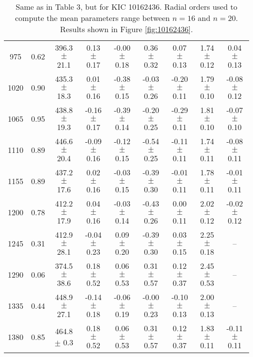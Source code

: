 \documentclass[twocolumn]{aastex61}%
\begin{document}
\begin{table*}[ht]
\begin{tabular}{ccc|ccccc|c}
975 & 0.62 & 396.3 $\pm$ 21.1 & 0.13 $\pm$ 0.17 & -0.00 $\pm$ 0.18 & 0.36 $\pm$ 0.32 & 0.07 $\pm$ 0.13 & 1.74 $\pm$ 0.12 & 0.04 $\pm$ 0.13\\
1020 & 0.90 & 435.3 $\pm$ 18.3 & 0.01 $\pm$ 0.16 & -0.38 $\pm$ 0.15 & -0.03 $\pm$ 0.26 & -0.20 $\pm$ 0.11 & 1.79 $\pm$ 0.10 & -0.08 $\pm$ 0.12\\
1065 & 0.95 & 438.8 $\pm$ 19.3 & -0.16 $\pm$ 0.17 & -0.39 $\pm$ 0.14 & -0.20 $\pm$ 0.25 & -0.29 $\pm$ 0.11 & 1.81 $\pm$ 0.10 & -0.07 $\pm$ 0.10\\
1110 & 0.89 & 446.6 $\pm$ 20.4 & -0.09 $\pm$ 0.16 & -0.12 $\pm$ 0.15 & -0.54 $\pm$ 0.25 & -0.11 $\pm$ 0.11 & 1.74 $\pm$ 0.11 & -0.08 $\pm$ 0.11\\
1155 & 0.89 & 437.2 $\pm$ 17.6 & 0.02 $\pm$ 0.16 & -0.03 $\pm$ 0.15 & -0.39 $\pm$ 0.30 & -0.01 $\pm$ 0.11 & 1.78 $\pm$ 0.11 & -0.01 $\pm$ 0.11\\
1200 & 0.78 & 412.2 $\pm$ 17.9 & 0.04 $\pm$ 0.16 & -0.03 $\pm$ 0.14 & -0.43 $\pm$ 0.26 & 0.00 $\pm$ 0.11 & 2.02 $\pm$ 0.12 & -0.02 $\pm$ 0.12\\
1245 & 0.31 & 412.9 $\pm$ 28.1 & -0.04 $\pm$ 0.23 & 0.09 $\pm$ 0.20 & -0.39 $\pm$ 0.30 & 0.03 $\pm$ 0.15 & 2.25 $\pm$ 0.18 & --\\
1290 & 0.06 & 374.5 $\pm$ 38.6 & 0.18 $\pm$ 0.52 & 0.06 $\pm$ 0.53 & 0.31 $\pm$ 0.57 & 0.12 $\pm$ 0.37 & 2.45 $\pm$ 0.53 & --\\
1335 & 0.44 & 448.9 $\pm$ 27.1 & -0.14 $\pm$ 0.18 & -0.06 $\pm$ 0.19 & -0.00 $\pm$ 0.23 & -0.10 $\pm$ 0.13 & 2.00 $\pm$ 0.13 & --\\
1380 & 0.85 & 464.8 $\pm$ 0.3 & 0.18 $\pm$ 0.52 & 0.06 $\pm$ 0.53 & 0.31 $\pm$ 0.57 & 0.12 $\pm$ 0.37 & 1.83 $\pm$ 0.11 & -0.11 $\pm$ 0.11\\
\end{tabular}
\caption{Same as in Table 3, but for KIC 10162436. Radial orders used to compute the mean parameters range between $n=16$ and $n=20$. Results shown in Figure \ref{fig:10162436}.}\label{tab:10162436}
\end{table*}
\end{document}
